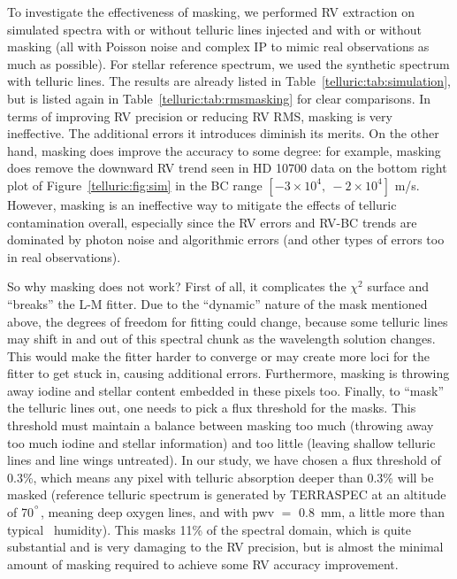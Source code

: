 To investigate the effectiveness of masking, we performed RV
extraction on simulated spectra with or without telluric lines
injected and with or without masking (all with Poisson noise and
complex IP to mimic real observations as much as possible). For
stellar reference spectrum, we used the synthetic spectrum with
telluric lines. The results are already listed in
Table~\ref{telluric:tab:simulation}, but is listed again in
Table~\ref{telluric:tab:rmsmasking} for clear comparisons. In terms of
improving RV precision or reducing RV RMS, masking is very
ineffective. The additional errors it introduces diminish its
merits. On the other hand, masking does improve the accuracy to some
degree: for example, masking does remove the downward RV trend seen in
HD 10700 data on the bottom right plot of
Figure~\ref{telluric:fig:sim} in the BC range $[-3\times10^4,\
-2\times10^4]$ m/s. However, masking is an ineffective way to mitigate
the effects of telluric contamination overall, especially since the RV
errors and RV-BC trends are dominated by photon noise and algorithmic
errors (and other types of errors too in real observations).

So why masking does not work? First of all, it complicates the
$\chi^2$ surface and ``breaks'' the L-M fitter. Due to the ``dynamic''
nature of the mask mentioned above, the degrees of freedom for fitting
could change, because some telluric lines may shift in and out of this
spectral chunk as the wavelength solution changes. This would make the
fitter harder to converge or may create more loci for the fitter to
get stuck in, causing additional errors. Furthermore, masking is
throwing away iodine and stellar content embedded in these pixels
too. Finally, to ``mask'' the telluric lines out, one needs to pick a
flux threshold for the masks. This threshold must maintain a balance
between masking too much (throwing away too much iodine and stellar
information) and too little (leaving shallow telluric lines and line
wings untreated). In our study, we have chosen a flux threshold of
0.3\%, which means any pixel with telluric absorption deeper than
0.3\% will be masked (reference telluric spectrum is generated by
TERRASPEC at an altitude of 70$^{^{\circ}}$, meaning deep oxygen lines,
and with pwv $=$ 0.8~mm, a little more than
typical \keck\ humidity). This masks 11\% of the spectral domain,
which is quite substantial and is very damaging to the RV precision,
but is almost the minimal amount of masking required to achieve some
RV accuracy improvement.


